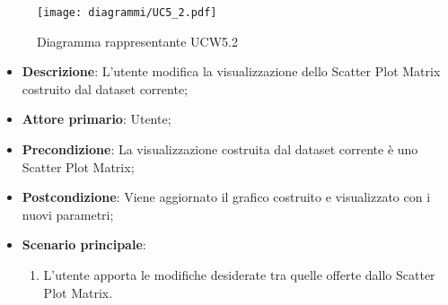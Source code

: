 \begin{figure}[h]
    \centering
    \texttt{[image: diagrammi/UC5\_2.pdf]}
    \caption{Diagramma rappresentante UCW5.2}
    \label{fig:UCW5.2}
\end{figure}


\begin{itemize}
    \item \textbf{Descrizione}: L’utente modifica la visualizzazione dello Scatter Plot Matrix
                                costruito dal dataset corrente;

    \item \textbf{Attore primario}: Utente;

    \item \textbf{Precondizione}:   La visualizzazione costruita dal dataset corrente è uno Scatter Plot Matrix;

    \item \textbf{Postcondizione}:  Viene aggiornato il grafico costruito e visualizzato con i nuovi parametri;

	\item \textbf{Scenario principale}:
		\begin{enumerate}
            \item L'utente apporta le modifiche desiderate tra quelle offerte dallo Scatter Plot Matrix.
        \end{enumerate}
\end{itemize}


